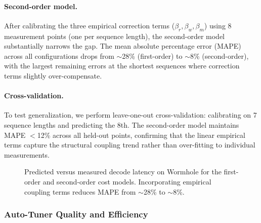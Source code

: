 \documentclass[sigconf, review, anonymous]{acmart}
\newcommand{\AutoTuner}{Auto-Tuner}
\begin{document}
\paragraph{Second-order model.}
After calibrating the three empirical correction terms ($\beta_r,
\beta_w, \beta_m$) using 8 measurement points (one per sequence
length), the second-order model substantially narrows the gap.  The
mean absolute percentage error (MAPE) across all configurations drops
from $\sim$28\% (first-order) to $\sim$8\% (second-order), with the
largest remaining errors at the shortest sequences where correction
terms slightly over-compensate.

\paragraph{Cross-validation.}
To test generalization, we perform leave-one-out cross-validation:
calibrating on 7 sequence lengths and predicting the 8th.  The
second-order model maintains MAPE $<$12\% across all held-out points,
confirming that the linear empirical terms capture the structural
coupling trend rather than over-fitting to individual measurements.

\begin{figure}[t]
  \centering
  \caption{Predicted versus measured decode latency on Wormhole for the
    first-order and second-order cost models.  Incorporating empirical
    coupling terms reduces MAPE from $\sim$28\% to $\sim$8\%.}
  \label{fig:model-accuracy}
\end{figure}



\subsubsection{\AutoTuner{} Quality and Efficiency}\label{sec:eval-tuner-auto}

\end{document}
